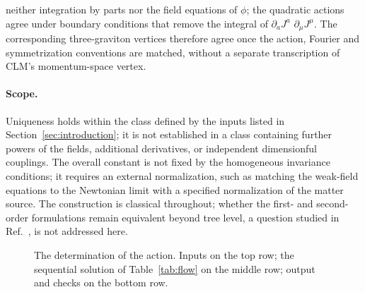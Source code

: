 \documentclass[prd,aps,preprint,superscriptaddress,nofootinbib,amsmath,amssymb,eqsecnum]{revtex4-2}
\newcommand{\W}{\mathcal{W}}
\providecommand{\DIFaddtex}[1]{{\protect\color{blue} \sf #1}} %
\providecommand{\DIFdeltex}[1]{{\protect\color{red} \scriptsize #1}} %
\providecommand{\DIFaddbegin}{} %
\providecommand{\DIFaddend}{} %
\providecommand{\DIFdelbegin}{} %
\providecommand{\DIFdelend}{} %
\providecommand{\DIFadd}[1]{\texorpdfstring{\DIFaddtex{#1}}{#1}} %
\providecommand{\DIFdel}[1]{\texorpdfstring{\DIFdeltex{#1}}{}} %
\begin{document}
neither integration by parts nor the field equations of $\phi$; the quadratic actions agree
under boundary conditions that remove the integral of \DIFdelbegin \DIFdel{$\partial_aJ^a$}\DIFdelend \DIFaddbegin \DIFadd{$\partial_\mu J^\mu$}\DIFaddend . The corresponding
three-graviton vertices therefore agree once the action, Fourier and symmetrization
conventions are matched, without a separate transcription of CLM's momentum-space vertex.

\paragraph{Scope.} Uniqueness holds within the class defined by the inputs listed in
Section~\ref{sec:introduction}; it is not established in a class containing further powers of
the fields, additional derivatives, or independent dimensionful couplings. The overall
constant is not fixed by the homogeneous invariance conditions; it requires an external
normalization, such as matching the weak-field equations to the Newtonian limit with a
specified normalization of the matter source. The construction is classical throughout;
whether the first- and second-order formulations remain equivalent beyond tree level, a
question studied in Ref.~\cite{BrandtMcKeon2016}, is not addressed here.

\begin{figure}[htb]
\centering
{}
\caption{The determination of the action. Inputs on the top row; the sequential solution of
Table~\ref{tab:flow} on the middle row; output and checks on the bottom row.}
\label{fig:flow}
\end{figure}
\end{document}
